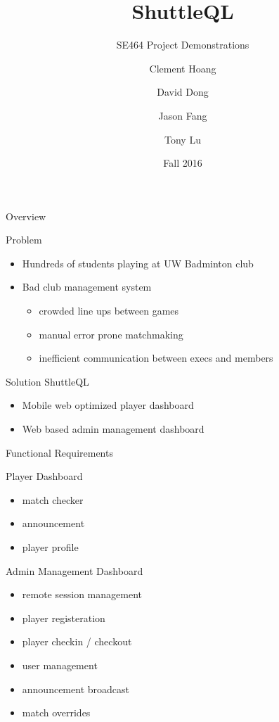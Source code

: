 \documentclass{beamer}
\title{ShuttleQL}
\subtitle{SE464 Project Demonstrations}
\author{Clement Hoang \and David Dong \and Jason Fang \and Tony Lu}
\institute{University of Waterloo}
\date{Fall 2016}
\begin{document}
\begin{frame}
  \titlepage
\end{frame}

\begin{frame}
\Huge Overview
\end{frame}

\begin{frame}{Problem}
  \begin{itemize}
    \item Hundreds of students playing at UW Badminton club
    \item Bad club management system
      \begin{itemize}
        \item crowded line ups between games
        \item manual error prone matchmaking
        \item inefficient communication between execs and members
      \end{itemize}
  \end{itemize}
\end{frame}

\begin{frame}{Solution}
ShuttleQL
\begin{itemize}
  \item Mobile web optimized player dashboard
  \item Web based admin management dashboard
\end{itemize}
\end{frame}

\begin{frame}
\Huge Functional Requirements
\end{frame}

\begin{frame}{Player Dashboard}
\begin{itemize}
\item match checker
\item announcement
\item player profile
\end{itemize}
\end{frame}

\begin{frame}{Admin Management Dashboard}
\begin{itemize}
\item remote session management
\item player registeration
\item player checkin / checkout
\item user management
\item announcement broadcast
\item match overrides
\end{itemize}
\end{frame}
\end{document}
